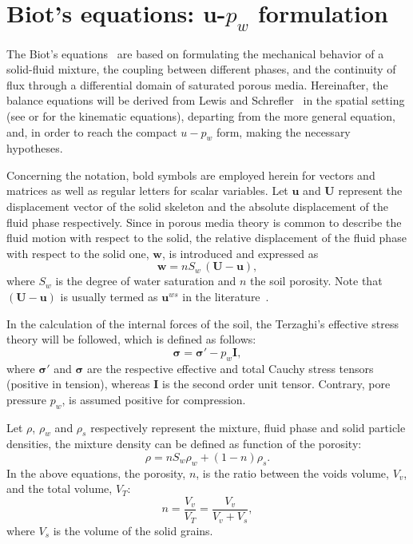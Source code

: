 \documentclass[twocolumn]{svjour3}          %
\begin{document}
\section{Biot's equations: u-$p_w$ formulation}
\label{sec:2}
The Biot's equations~\cite{Biot1956} are based on formulating the mechanical behavior of a solid-fluid mixture, the coupling between different phases, and the continuity of flux through a differential domain of saturated porous media. Hereinafter, the balance equations will be derived from Lewis and Schrefler~\cite{LewisSchrefler98} in the spatial setting (see \cite{LewisSchrefler98} or \cite{Sanavia:02b,Sanavia:02} for the kinematic equations), departing from the more general equation, and, in order to reach the compact $u-p_w$ form, making the necessary hypotheses.

Concerning the notation, bold symbols are employed herein for vectors and matrices as well as regular letters for scalar variables.  Let   $\boldsymbol{u}$ and   $\boldsymbol{U}$ represent  the displacement vector of the solid skeleton   and the absolute displacement of the fluid phase respectively. Since in porous media theory is common to describe the fluid motion with respect to the solid, the
relative displacement of the fluid phase with respect to the solid one, $\boldsymbol{w}$, is introduced and expressed as~\cite{LopezQuerol2008}
\begin{equation}\label{eq_uw1}
\boldsymbol{ w }=n S_w\, \boldsymbol{  \left(U-u\right) },
\end{equation}
where $S_w$ is the degree of water saturation and $n$ the soil porosity.  Note that $\boldsymbol{  \left(U-u\right) }$ is usually  termed as $\boldsymbol{u}^{ws}$ in the literature~\cite{LewisSchrefler98}. 

In the calculation of the internal forces of the soil, the Terzaghi's effective stress theory  \cite{Terzaghi1925} will be followed, which is defined as follows:
\begin{equation}\label{eq_uw5}
 \boldsymbol{ \sigma} =\boldsymbol{ \sigma'} - p_{w}\textbf{I},
\end{equation}
where $ \boldsymbol{ \sigma'} $ and  $\boldsymbol{ \sigma}$ are the respective effective and total Cauchy stress tensors (positive in tension), whereas $\textbf{I}$ is the second order unit tensor.  Contrary, pore pressure $p_w$, is assumed positive for compression.

Let $\rho$, $\rho_{w}$ and $\rho_{s}$ respectively represent the mixture, fluid phase and solid particle densities,   the mixture density can be  defined as function of the porosity:
\begin{equation}\label{eq_uw2}
\rho=n S_w \rho_{w}+(1-n) \rho_s.
\end{equation}
In the above equations, the porosity, $n$, is the ratio  between the voids volume, $V_v$, and the total volume, $V_T$:
\begin{equation}\label{eq_uw3}
n=\frac{V_v}{V_T}=\frac{V_v}{V_v+V_s},
\end{equation}
where $V_s$ is the volume of the solid grains.
\end{document}
